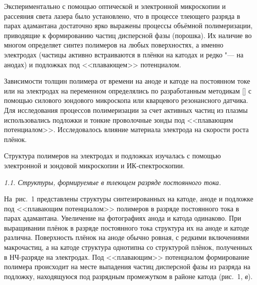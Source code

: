 Экспериментально  с помощью оптической и электронной микроскопии и
рассеяния света лазера было установлено, что в процессе тлеющего
разряда в парах адамантана достаточно ярко выражены процессы
объёмной полимеризации, приводящие к формированию частиц
дисперсной фазы (порошка). Их наличие во многом определяет синтез
полимеров на любых поверхностях, а именно электродах (частицы
активно встраиваются в плёнки на катодах и редко  "--- на анодах) и
подложках под <<плавающем>> потенциалом.

Зависимости толщин полимера от времени на аноде и катоде на
постоянном токе или на электродах на переменном определялись по
разработанным методикам [] с помощью
силового зондового микроскопа или кварцевого резонансного датчика.
Для исследования процессов полимеризации за счет активных частиц
из плазмы использовались подложки и тонкие проволочные зонды под
<<плавающим потенциалом>>. Исследовалось влияние материала
электрода на скорости роста плёнок.

Структура полимеров на электродах и подложках изучалась с помощью
электронной и зондовой микроскопии и ИК-спектроскопии.

\newpage


 {\sl 1.1. Структуры, формируемые в тлеющем разряде постоянного
тока.} 

\noindent На~рис.~1 представлены структуры синтезированных на катоде,
аноде и подложке под <<плавающим потенциалом>> полимеров в разряде
постоянного тока в парах адамантана. Увеличение на фотографиях
анода и катода одинаково. При выращивании плёнок в разряде
постоянного тока структура их на аноде и катоде различна.
Поверхность плёнок на аноде обычно ровная, с редкими включениями
макрочастиц, а на катоде структура однотипна со структурой плёнок,
полученных в НЧ-разряде на электродах. Под <<плавающим>>
потенциалом формирование полимера происходит на месте выпадения
частиц дисперсной фазы из разряда на подложку, находящуюся под
разрядным промежутком в районе катода (рис.~1, {\sl в}).

